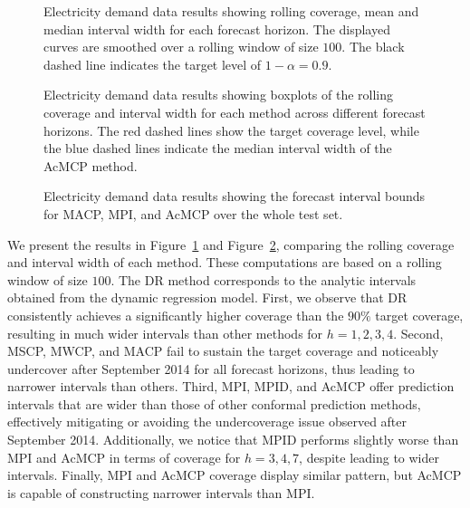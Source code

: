 \documentclass[
  11pt,
  a4paper,
]{article}
\theoremstyle{plain}
\theoremstyle{remark}
\begin{document}
\begin{figure}


\caption{\label{fig-elec_cov}Electricity demand data results showing
rolling coverage, mean and median interval width for each forecast
horizon. The displayed curves are smoothed over a rolling window of size
\(100\). The black dashed line indicates the target level of
\(1-\alpha=0.9\).}

\end{figure}%

\begin{figure}


\caption{\label{fig-elec_box}Electricity demand data results showing
boxplots of the rolling coverage and interval width for each method
across different forecast horizons. The red dashed lines show the target
coverage level, while the blue dashed lines indicate the median interval
width of the AcMCP method.}

\end{figure}%

\begin{figure}


\caption{\label{fig-elec_timeplot}Electricity demand data results
showing the forecast interval bounds for MACP, MPI, and AcMCP over the
whole test set.}

\end{figure}%

We present the results in Figure~\ref{fig-elec_cov} and
Figure~\ref{fig-elec_box}, comparing the rolling coverage and interval
width of each method. These computations are based on a rolling window
of size \(100\). The DR method corresponds to the analytic intervals
obtained from the dynamic regression model. First, we observe that DR
consistently achieves a significantly higher coverage than the \(90\%\)
target coverage, resulting in much wider intervals than other methods
for \(h=1,2,3,4\). Second, MSCP, MWCP, and MACP fail to sustain the
target coverage and noticeably undercover after September 2014 for all
forecast horizons, thus leading to narrower intervals than others.
Third, MPI, MPID, and AcMCP offer prediction intervals that are wider
than those of other conformal prediction methods, effectively mitigating
or avoiding the undercoverage issue observed after September 2014.
Additionally, we notice that MPID performs slightly worse than MPI and
AcMCP in terms of coverage for \(h=3,4,7\), despite leading to wider
intervals. Finally, MPI and AcMCP coverage display similar pattern, but
AcMCP is capable of constructing narrower intervals than MPI.
\end{document}
